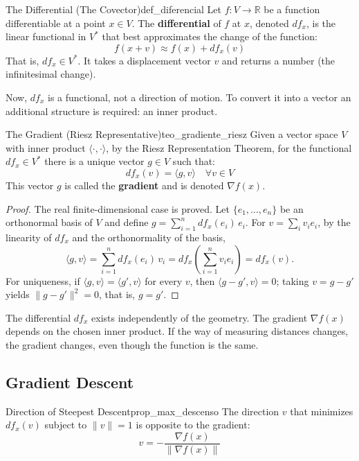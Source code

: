 \documentclass[11pt, a4paper]{article}
\begin{document}
\begin{definicion}{The Differential (The Covector)}{def_diferencial}
Let $f: V \to \mathbb{R}$ be a function differentiable at a point $x \in V$. The \textbf{differential} of $f$ at $x$, denoted $df_x$, is the linear functional in $V^*$ that best approximates the change of the function:
\[
f(x + v) \approx f(x) + df_x(v)
\]
That is, $df_x \in V^*$. It takes a displacement vector $v$ and returns a number (the infinitesimal change).
\end{definicion}

Now, $df_x$ is a functional, not a direction of motion. To convert it into a vector an additional structure is required: an inner product.

\begin{teorema}{The Gradient (Riesz Representative)}{teo_gradiente_riesz}
Given a vector space $V$ with inner product $\langle \cdot, \cdot \rangle$, by the Riesz Representation Theorem, for the functional $df_x \in V^*$ there is a unique vector $g \in V$ such that:
\[
df_x(v) = \langle g, v \rangle \quad \forall v \in V
\]
This vector $g$ is called the \textbf{gradient} and is denoted $\nabla f(x)$.
\end{teorema}

\begin{proof}
The real finite-dimensional case is proved. Let $\{e_1, \dots, e_n\}$ be an orthonormal basis of $V$ and define $g = \sum_{i=1}^n df_x(e_i)\, e_i$. For $v = \sum_i v_i e_i$, by the linearity of $df_x$ and the orthonormality of the basis,
\[
\langle g, v \rangle = \sum_{i=1}^n df_x(e_i)\, v_i = df_x\!\left( \sum_{i=1}^n v_i e_i \right) = df_x(v).
\]
For uniqueness, if $\langle g, v \rangle = \langle g', v \rangle$ for every $v$, then $\langle g - g', v \rangle = 0$; taking $v = g - g'$ yields $\|g - g'\|^2 = 0$, that is, $g = g'$.
\end{proof}

\obs
The differential $df_x$ exists independently of the geometry. The gradient $\nabla f(x)$ depends on the chosen inner product. If the way of measuring distances changes, the gradient changes, even though the function is the same.

\subsection{Gradient Descent}

\begin{proposicion}{Direction of Steepest Descent}{prop_max_descenso}
The direction $v$ that minimizes $df_x(v)$ subject to $\|v\|=1$ is opposite to the gradient:
\[
v = -\frac{\nabla f(x)}{\|\nabla f(x)\|}
\]
\end{proposicion}
\end{document}
